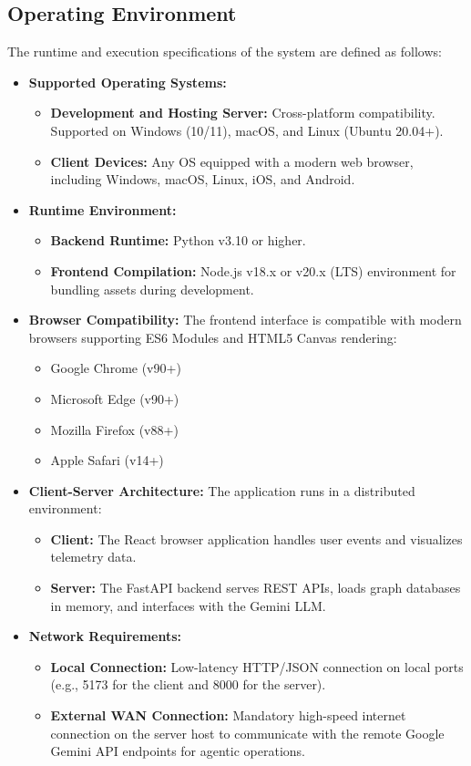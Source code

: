 \subsection[Operating Environment]{Operating Environment}
The runtime and execution specifications of the system are defined as follows:

\begin{itemize}
    \item \textbf{Supported Operating Systems:}
    \begin{itemize}
        \item \textbf{Development and Hosting Server:} Cross-platform compatibility. Supported on Windows (10/11), macOS, and Linux (Ubuntu 20.04+).
        \item \textbf{Client Devices:} Any OS equipped with a modern web browser, including Windows, macOS, Linux, iOS, and Android.
    \end{itemize}
    \item \textbf{Runtime Environment:}
    \begin{itemize}
        \item \textbf{Backend Runtime:} Python v3.10 or higher.
        \item \textbf{Frontend Compilation:} Node.js v18.x or v20.x (LTS) environment for bundling assets during development.
    \end{itemize}
    \item \textbf{Browser Compatibility:} The frontend interface is compatible with modern browsers supporting ES6 Modules and HTML5 Canvas rendering:
    \begin{itemize}
        \item Google Chrome (v90+)
        \item Microsoft Edge (v90+)
        \item Mozilla Firefox (v88+)
        \item Apple Safari (v14+)
    \end{itemize}
    \item \textbf{Client-Server Architecture:} The application runs in a distributed environment:
    \begin{itemize}
        \item \textbf{Client:} The React browser application handles user events and visualizes telemetry data.
        \item \textbf{Server:} The FastAPI backend serves REST APIs, loads graph databases in memory, and interfaces with the Gemini LLM.
    \end{itemize}
    \item \textbf{Network Requirements:}
    \begin{itemize}
        \item \textbf{Local Connection:} Low-latency HTTP/JSON connection on local ports (e.g., 5173 for the client and 8000 for the server).
        \item \textbf{External WAN Connection:} Mandatory high-speed internet connection on the server host to communicate with the remote Google Gemini API endpoints for agentic operations.
    \end{itemize}
\end{itemize}
